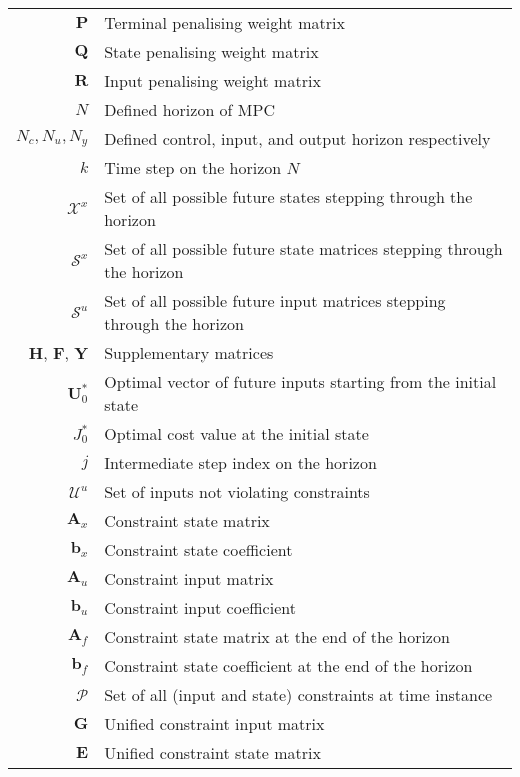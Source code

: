 \begin{scriptsize}
\begin{tabularx}{\textwidth}{r|X}
	$\textbf{P}$                    & Terminal penalising weight matrix\\
$\textbf{Q}$                    & State penalising weight matrix\\
$\textbf{R}$                    & Input penalising weight matrix\\

	$N$											& Defined horizon of MPC\\
	$N_c,N_u,N_y$											& Defined control, input, and output horizon respectively\\
	$k$																& Time step on the horizon $N$ \\

$\mathcal{X}^x$             & Set of all possible future states stepping through the horizon\\
$\mathcal{S}^x$             & Set of all possible future state matrices stepping through the horizon\\
$\mathcal{S}^u$             & Set of all possible future input matrices stepping through the horizon\\
$\textbf{H}$, $\textbf{F}$, $\textbf{Y}$ & Supplementary matrices\\
$\textbf{U}^*_0$            & Optimal vector of future inputs starting from the initial state\\
$J^*_0$            & Optimal cost value at the initial state\\
$j$                         & Intermediate step index on the horizon\\
$\mathcal{U}^u$             & Set of inputs not violating constraints\\
$\textbf{A}_x$              & Constraint state matrix\\
$\textbf{b}_x$              & Constraint state coefficient\\
$\textbf{A}_u$              & Constraint input matrix\\
$\textbf{b}_u$              & Constraint input coefficient\\
$\textbf{A}_f$              & Constraint state matrix at the end of the horizon\\
$\textbf{b}_f$              & Constraint state coefficient at the end of the horizon\\
$\mathcal{P}$               & Set of all (input and state) constraints at time instance\\
$\textbf{G}$                & Unified constraint input matrix \\
$\textbf{E}$                & Unified constraint state matrix \\

\end{tabularx}
\end{scriptsize}
